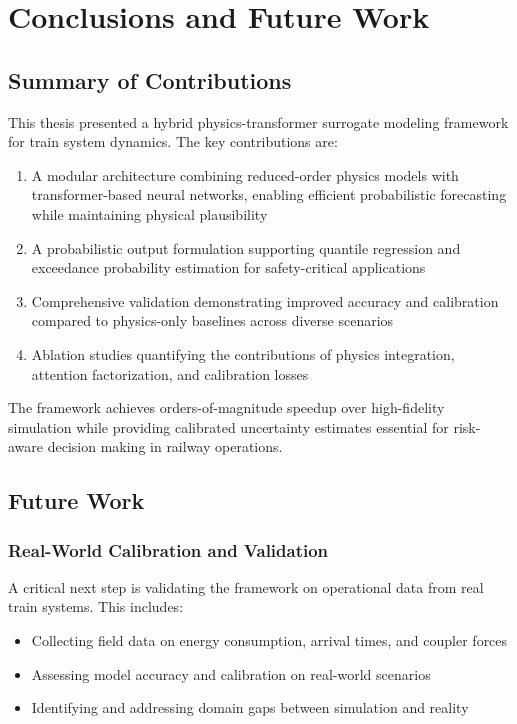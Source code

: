 \chapter{Conclusions and Future Work}
\label{ch:conclusion}

\section{Summary of Contributions}

This thesis presented a hybrid physics-transformer surrogate modeling framework for train system dynamics. The key contributions are:

\begin{enumerate}
    \item A modular architecture combining reduced-order physics models with transformer-based neural networks, enabling efficient probabilistic forecasting while maintaining physical plausibility
    \item A probabilistic output formulation supporting quantile regression and exceedance probability estimation for safety-critical applications
    \item Comprehensive validation demonstrating improved accuracy and calibration compared to physics-only baselines across diverse scenarios
    \item Ablation studies quantifying the contributions of physics integration, attention factorization, and calibration losses
\end{enumerate}

The framework achieves orders-of-magnitude speedup over high-fidelity simulation while providing calibrated uncertainty estimates essential for risk-aware decision making in railway operations.


\section{Future Work}

\subsection{Real-World Calibration and Validation}

A critical next step is validating the framework on operational data from real train systems. This includes:
\begin{itemize}
    \item Collecting field data on energy consumption, arrival times, and coupler forces
    \item Assessing model accuracy and calibration on real-world scenarios
    \item Identifying and addressing domain gaps between simulation and reality
\end{itemize}

